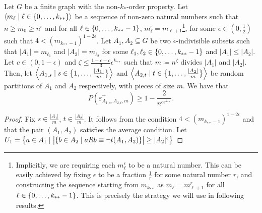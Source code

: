        \begin{lemma} \label{lem:bound_on_the_probability_of_a_subpair_having_no_exceptions}
            Let $G$ be a finite graph with the non-$k_{*}$-order property.
            Let $\left< m_\ell \mid \ell \in \{ 0, \dots, k_{**} \} \right>$ be a sequence of non-zero natural numbers such that
            $n \geq m_0 \geq n^\epsilon$  and for all $\ell \in \{ 0, \dots, k_{**}-1 \}$,
            $m_\ell^\epsilon = m_{\ell+1}$\footnote{
                Implicitly, we are requiring each $m_\ell^\epsilon$ to be a natural number.
                This can be easily achieved by fixing $\epsilon$ to be a fraction $\frac{1}{r}$ for some natural number
                $r$, and constructing the sequence starting from $m_{k_{**}}$ as $m_\ell = m_{\ell+1}^r$ for all
                $\ell \in \{ 0, \dots, k_{**}-1 \}$.
                This is precisely the strategy we will use in following results.},
            for some $\epsilon \in (0, \frac{1}{2})$ such that $4 < (m_{k_{**}-1})^{1-2\epsilon}$.
            Let $A_1, A_2 \subseteq G$ be two $\epsilon$-indivisible subsets such that $|A_1| = m_{\ell_1}$ and $|A_2| = m_{\ell_2}$
            for some $\ell_1, \ell_2 \in \{ 0, \dots, k_{**}-1 \}$ and $|A_1| \leq |A_2|$.
            Let $c \in (0, 1-\epsilon)$ and $\zeta \leq \frac{1 - \epsilon - c}{3}\epsilon^{k_{**}}$ such that
            $m \coloneqq n^\zeta$ divides $|A_1|$ and $|A_2|$.
            Then, let $\left< A_{1,s} \mid s \in \bigl\{ 1, \dots, \frac{|A_1|}{m} \bigr\} \right>$ and
            $\left< A_{2,t} \mid t \in \bigl\{ 1, \dots, \frac{|A_2|}{m} \bigr\} \right>$ be random partitions of $A_1$ and $A_2$
            respectively, with pieces of size $m$.
            We have that
            \[
                P(\varepsilon^+_{A_{1,s},A_{2,t},m}) \geq 1 - \frac{2}{n^{c\epsilon^{k_{**}}}}.
            \]
            \begin{proof}
                Fix $s \in \frac{|A_1|}{m}$, $t \in \frac{|A_2|}{m}$.
                It follows from the condition $4 < (m_{k_{**}-1})^{1-2\epsilon}$ and 
                that the pair $(A_{1}, A_{2})$ satisfies the average condition.
                Let $U_1 = \bigl\{ a \in A_1 \mid \bigl| \{ b \in A_2 \mid a R b \equiv \neg t(A_1, A_2) \} \bigr| \geq |A_2|^\epsilon \bigr\}$

\end{proof}
\end{lemma}
